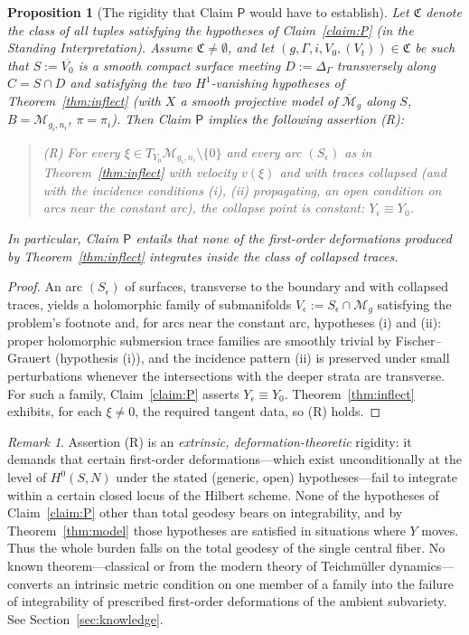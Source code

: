 \documentclass[11pt]{amsart}
\newcommand{\M}{\mathcal{M}}
\theoremstyle{plain}
\newtheorem{proposition}[theorem]{Proposition}
\theoremstyle{definition}
\theoremstyle{remark}
\newtheorem{remark}[theorem]{Remark}
\begin{document}
\begin{proposition}[The rigidity that Claim $\mathsf{P}$ would have to establish]
\label{prop:R}
Let $\mathfrak C$ denote the class of all tuples satisfying the hypotheses of
Claim~\ref{claim:P} (in the Standing Interpretation). Assume $\mathfrak C\ne\emptyset$,
and let $(g,\Gamma,i,V_0,(V_t))\in\mathfrak C$ be such that $S:=\overline{V_0}$ is a
smooth compact surface meeting $D:=\Delta_\Gamma$ transversely along
$C=S\cap D$ and satisfying the two $H^1$-vanishing hypotheses of
Theorem~\textup{\ref{thm:inflect}} (with $X$ a smooth projective model of
$\overline{\M}_g$ along $S$, $B=\M_{g_i,n_i}$, $\pi=\pi_i$). Then Claim
$\mathsf{P}$ \emph{implies} the following assertion \textup{(R)}:
\begin{quote}
\textup{(R)}\; For every $\xi\in T_{Y_0}\M_{g_i,n_i}\setminus\{0\}$ and every arc
$(S_\epsilon)$ as in Theorem~\textup{\ref{thm:inflect}} with velocity $v(\xi)$ and
with traces collapsed (and with the incidence conditions (i), (ii) propagating, an
open condition on arcs near the constant arc), the collapse point is constant:
$Y_\epsilon\equiv Y_0$.
\end{quote}
In particular, Claim $\mathsf{P}$ entails that \emph{none} of the first-order
deformations produced by Theorem~\textup{\ref{thm:inflect}} integrates inside the
class of collapsed traces.
\end{proposition}

\begin{proof}
An arc $(S_\epsilon)$ of surfaces, transverse to the boundary and with collapsed
traces, yields a holomorphic family of submanifolds
$V_\epsilon:=S_\epsilon\cap \M_g$ satisfying the problem's footnote and, for arcs
near the constant arc, hypotheses (i) and (ii): proper holomorphic submersion trace
families are smoothly trivial by Fischer--Grauert \cite{FG} (hypothesis (i)), and the
incidence pattern (ii) is preserved under small perturbations whenever the
intersections with the deeper strata are transverse. For such a family,
Claim~\ref{claim:P} asserts $Y_\epsilon\equiv Y_0$. Theorem~\ref{thm:inflect}
exhibits, for each $\xi\ne0$, the required tangent data, so (R) holds.
\end{proof}

\begin{remark}\label{rem:nomech}
Assertion (R) is an \emph{extrinsic, deformation-theoretic} rigidity: it demands that
certain first-order deformations---which exist unconditionally at the level of
$H^0(S,N)$ under the stated (generic, open) hypotheses---fail to integrate within a
certain closed locus of the Hilbert scheme. None of the hypotheses of
Claim~\ref{claim:P} other than total geodesy bears on integrability, and by
Theorem~\ref{thm:model} those hypotheses are satisfied in situations where $Y$ moves.
Thus the whole burden falls on the total geodesy of the single central fiber. No
known theorem---classical or from the modern theory of Teichm\"uller dynamics---converts
an intrinsic metric condition on one member of a family into the failure of
integrability of prescribed first-order deformations of the ambient subvariety. See
Section~\ref{sec:knowledge}.
\end{remark}
\end{document}
